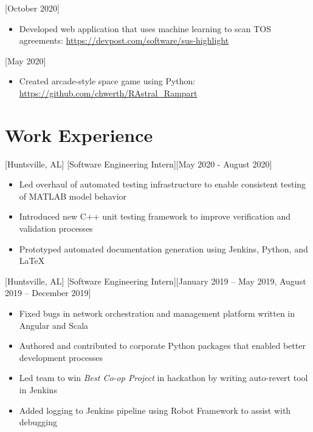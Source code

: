 \documentclass[hidelinks, 11pt]{article}
\newcommand{\link}[1]{{\color{blue}\href{#1}{#1}}}
\begin{document}
[October 2020]

\begin{itemize}
  \item Developed web application that uses machine learning to scan TOS agreements: \link{https://devpost.com/software/sus-highlight}
\end{itemize}

[May 2020]

\begin{itemize}
  \item Created arcade-style space game using Python: \link{https://github.com/chwerth/RAstral\_Rampart}
\end{itemize}

\section{Work Experience}

[Huntsville, AL]
[Software Engineering Intern][May 2020 - August 2020]

\begin{itemize}
  \item Led overhaul of automated testing infrastructure to enable consistent testing of MATLAB model behavior
  \item Introduced new C++ unit testing framework to improve verification and validation processes
  \item Prototyped automated documentation generation using Jenkins, Python, and LaTeX
\end{itemize}

[Huntsville, AL]
[Software Engineering Intern][January 2019 – May 2019, August 2019 – December 2019]

\begin{itemize}
  \item Fixed bugs in network orchestration and management platform written in Angular and Scala
  \item Authored and contributed to corporate Python packages that enabled better development processes
  \item Led team to win \textit{Best Co-op Project} in hackathon by writing auto-revert tool in Jenkins
  \item Added logging to Jenkins pipeline using Robot Framework to assist with debugging
\end{itemize}
\end{document}
